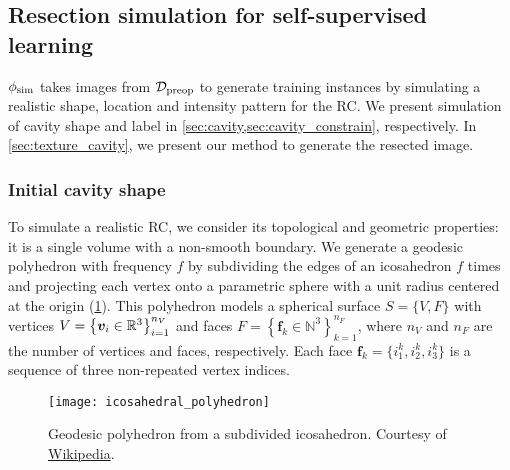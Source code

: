 \subsection{Resection simulation for self-supervised learning}
\label{sec:simulation}

\newcommand{\AAA}{\bm{A}}
\newcommand{\NN}{\mathcal{N}}


$\phi_{\text{sim}}$ takes images from $\mathcal{D}_{\text{preop}}$ to generate training instances by simulating a realistic shape, location and intensity pattern for the \ac{RC}.
We present simulation of cavity shape and label in \cref{sec:cavity,sec:cavity_constrain}, respectively.
In \cref{sec:texture_cavity}, we present our method to generate the resected image.


\subsubsection{Initial cavity shape}
\label{sec:cavity}

To simulate a realistic \ac{RC}, we consider its topological and geometric properties: it is a single volume with a non-smooth boundary.
We generate a geodesic polyhedron with frequency $f$ by subdividing the edges of an icosahedron $f$ times and projecting each vertex onto a parametric sphere with a unit radius centered at the origin (\cref{fig:icosahedron}).
This polyhedron models a spherical surface $S = \{ V, F \}$ with vertices
$
  V = \left\{
    \bm{v}_i \in \mathbb{R}^3
  \right\}
  _{i = 1}^{n_V}
$
and faces
$
  F = \left\{
    \bm{f}_k \in \mathbb{N}^3
  \right\}
  _{k = 1}^{n_F}
$, where $n_V$ and $n_F$ are the number of vertices and faces, respectively.
%
Each face $\bm{f}_k = \{ i_1^k, i_2^k, i_3^k \}$ is a sequence of three non-repeated vertex indices.

\begin{figure}
  \centering
  \texttt{[image: icosahedral\_polyhedron]}
  \caption[Geodesic polyhedron from a subdivided icosahedron]{
    Geodesic polyhedron from a subdivided icosahedron.
    Courtesy of \href{https://en.wikipedia.org/wiki/Geodesic_polyhedron}{Wikipedia}.
  }
  \label{fig:icosahedron}
\end{figure}

